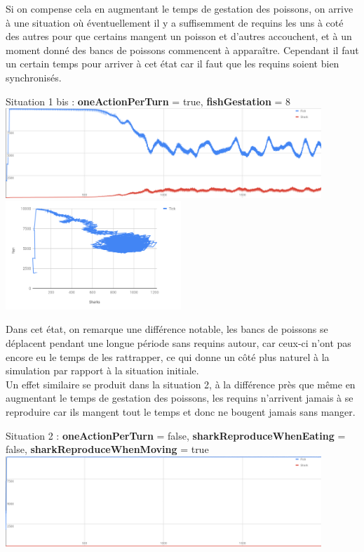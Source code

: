 \documentclass[11pt,a4paper,oneside]{report}
\begin{document}
Si on compense cela en augmentant le temps de gestation des poissons, on arrive à une situation où éventuellement il y a suffisemment de requins les uns à coté des autres pour que certains mangent un poisson et d'autres accouchent, et à un moment donné des bancs de poissons commencent à apparaître. Cependant il faut un certain temps pour arriver à cet état car il faut que les requins soient bien synchronisés.
\begin{center}
Situation 1 bis : \textbf{oneActionPerTurn} = true, \textbf{fishGestation} = 8
\includegraphics[width=450px]{wator_1bis}\\
\includegraphics[width=250px]{wator_1bisb}
\end{center}
Dans cet état, on remarque une différence notable, les bancs de poissons se déplacent pendant une longue période sans requins autour, car ceux-ci n'ont pas encore eu le temps de les rattrapper, ce qui donne un côté plus naturel à la simulation par rapport à la situation initiale.\\

Un effet similaire se produit dans la situation 2, à la différence près que même en augmentant le temps de gestation des poissons, les requins n'arrivent jamais à se reproduire car ils mangent tout le temps et donc ne bougent jamais sans manger.
\begin{center}
Situation 2 : \textbf{oneActionPerTurn} = false, \textbf{sharkReproduceWhenEating} = false, \textbf{sharkReproduceWhenMoving} = true
\includegraphics[width=450px]{wator_2}
\end{center}
\end{document}
